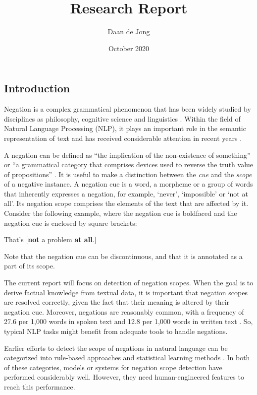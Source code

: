 \documentclass{article}
\title{Research Report}
\author{Daan de Jong}
\date{October 2020}
\begin{document}


\pagestyle{fancy}

\begin{multicols}{2}

\section{Introduction}

Negation is a complex grammatical phenomenon that has been widely studied by disciplines as philosophy, cognitive science and linguistics \citep{modality-and-negation}. Within the field of Natural Language Processing (NLP), it plays an important role in the semantic representation of text and has received considerable attention in recent years \citep{SEM-shared-task}. 

A negation can be defined as ``the implication of the non-existence of something'' \citep{bioscope} or ``a grammatical category that comprises devices used to reverse the truth value of propositions'' \citep{SEM-shared-task}. It is useful to make a distinction between the \textit{cue} and the \textit{scope} of a negative instance. A negation cue is a word, a morpheme or a group of words that inherently expresses a negation, for example, `never', `impossible' or `not at all'. Its negation scope comprises the elements of the text that are affected by it. Consider the following example, where the negation cue is boldfaced and the negation cue is enclosed by square brackets:

\begin{center}
That's [\textbf{not} a problem \textbf{at all}.]
\end{center}

Note that the negation cue can be discontinuous, and that it is annotated as a part of its scope.

The current report will focus on detection of negation scopes. When the goal is to derive factual knowledge from textual data, it is important that negation scopes are resolved correctly, given the fact that their meaning is altered by their negation cue. Moreover, negations are reasonably common, with a frequency of 27.6 per 1,000 words in spoken text and 12.8 per 1,000 words in written text \citep{tottie}. So, typical NLP tasks might benefit from adequate tools to handle negations.

Earlier efforts to detect the scope of negations in natural language can be categorized into rule-based approaches \citep[e.g.][]{basile2012ugroningen, ozgur-radev-2009-detecting, ovrelid-2010} and statistical learning methods \citep[e.g.][]{fei2020negation, zou-etal-2013-tree, tang-etal-2010-cascade}. In both of these categories, models or systems for negation scope detection have performed considerably well. However, they need human-engineered features to reach this performance. 


\end{multicols}
\end{document}
